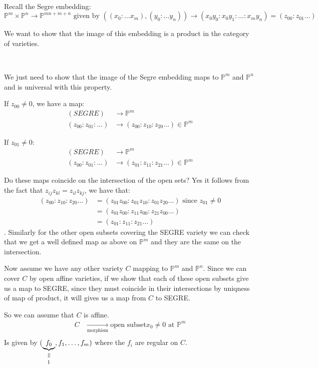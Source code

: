 \

Recall the Segre embedding:\[\mathbb{P}^m\times\mathbb{P}^n\rightarrow \mathbb{P}^{mn+m+n} \text{ given by } ((x_0\colon \ldots x_m),(y_0\colon \ldots y_n)) \rightarrow (x_0y_0\colon x_0y_1\colon \ldots\colon x_my_n) = (z_{00}\colon z_{01}\ldots)\]

We want to show that the image of this embedding is a product in the category of varieties. 

\

We just need to show that the image of the Segre embedding maps to $\mathbb{P}^m$ and $\mathbb{P}^n$ and is universal with this property.

If $z_{00}\neq 0$, we have a map:\begin{align*}
    (SEGRE)&\rightarrow \mathbb{P}^m\\
    (z_{00}\colon z_{01}\colon \ldots) &\rightarrow (z_{00}\colon z_{10}\colon z_{20}\ldots)\in \mathbb{P}^m
\end{align*}

If $z_{01}\neq 0$:\begin{align*}
    (SEGRE)&\rightarrow \mathbb{P}^m\\
    (z_{00}\colon z_{01}\colon \ldots) &\rightarrow (z_{01}\colon z_{11}\colon z_{21}\ldots)\in \mathbb{P}^m
\end{align*}

Do these maps coincide on the intersection of the open sets? Yes it follows from the fact that $z_{ij}z_{kl} = z_{il}z_{kj}$, we have that:\begin{align*}
    (z_{00}\colon z_{10}\colon z_{20}\ldots) &= (z_{01}z_{00}\colon z_{01}z_{10}\colon z_{01}z_{20}\ldots) \text{ since }z_{01}\neq 0\\
    &= (z_{01}z_{00}\colon z_{11}z_{00}\colon z_{21}z_{00}\ldots)\\
    &= (z_{01}\colon z_{11}\colon z_{21}\ldots)
\end{align*}. Similarly for the other open subsets covering the SEGRE variety we can check that we get a well defined map as above on $\mathbb{P}^m$ and they are the same on the intersection.

Now assume we have any other variety $C$ mapping to $\mathbb{P}^m$ and $\mathbb{P}^n$. Since we can cover $C$ by open affine varieties, if we show that each of these open subsets give us a map to SEGRE, since they must coincide in their intersections by uniqness of map of product, it will gives us a map from $C$ to SEGRE.

So we can assume that $C$ is affine. \begin{align*}
    C &\underset{\text{morphism}}{\rightarrow} \text{open subset}x_0\neq 0 \text{ at }\mathbb{P}^m\\
\end{align*}
Is given by $(\bverteq{f_0}{1}, f_1,\ldots,f_m)$ where the $f_i$ are regular on $C$.

